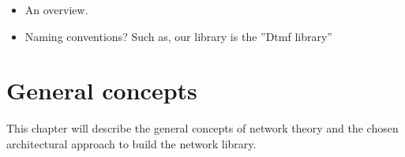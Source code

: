 
\begin{itemize}
 \item An overview.
 \item Naming conventions? Such as, our library is the ''Dtmf library''
\end{itemize}

\chapter{General concepts}\label{chap:general}
This chapter will describe the general concepts of network theory and the chosen architectural approach to build the network library.



